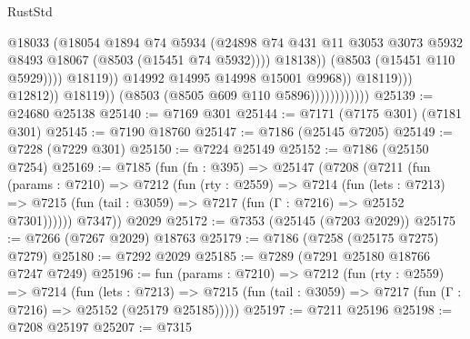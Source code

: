 \begin{lexlean}{RustStd}
\begin{coremodule}
                                                      @18033
                                                      (@18054
                                                        @1894
                                                        @74
                                                        @5934
                                                        (@24898
                                                          @74
                                                          @431
                                                          @11
                                                          @3053
                                                          @3073
                                                          @5932
                                                          @8493
                                                          @18067
                                                          (@8503 (@15451 @74 @5932))))
                                                      @18138))
                                                  (@8503 (@15451 @110 @5929))))
                                              @18119))
                                          @14992
                                          @14995
                                          @14998
                                          @15001
                                          @9968))
                                      @18119)))
                                @12812))
                            @18119))
                        (@8503 (@8505 @609 @110 @5896))))))))))))
@25139 := @24680 @25138
@25140 := @7169 @301
@25144 := @7171 (@7175 @301) (@7181 @301)
@25145 := @7190 @18760
@25147 := @7186 (@25145 @7205)
@25149 := @7228 (@7229 @301)
@25150 := @7224 @25149
@25152 := @7186 (@25150 @7254)
@25169 := @7185
    (fun (fn : @395) =>
    @25147
      (@7208
        (@7211
          (fun (params : @7210) =>
          @7212
            (fun (rty : @2559) =>
            @7214
              (fun (lets : @7213) =>
              @7215 (fun (tail : @3059) => @7217 (fun (Γ : @7216) => @25152 @7301))))))
        @7347))
    @2029
@25172 := @7353 (@25145 (@7203 @2029))
@25175 := @7266 (@7267 @2029) @18763
@25179 := @7186 (@7258 (@25175 @7275) @7279)
@25180 := @7292 @2029
@25185 := @7289 (@7291 @25180 @18766 @7247 @7249)
@25196 := fun (params : @7210) =>
  @7212
    (fun (rty : @2559) =>
    @7214
      (fun (lets : @7213) =>
      @7215 (fun (tail : @3059) => @7217 (fun (Γ : @7216) => @25152 (@25179 @25185)))))
@25197 := @7211 @25196
@25198 := @7208 @25197
@25207 := @7315

\end{coremodule}
\end{lexlean}
